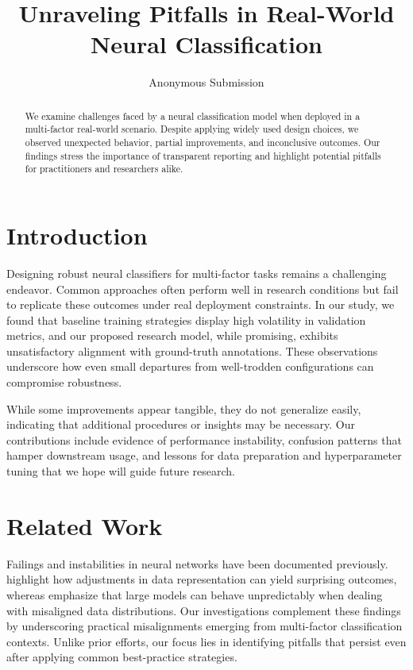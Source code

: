 \documentclass[11pt]{article}
\begin{document}
\title{Unraveling Pitfalls in Real-World Neural Classification}
\author{Anonymous Submission}
\date{}
\maketitle

\begin{abstract}
We examine challenges faced by a neural classification model when deployed in a multi-factor real-world scenario. Despite applying widely used design choices, we observed unexpected behavior, partial improvements, and inconclusive outcomes. Our findings stress the importance of transparent reporting and highlight potential pitfalls for practitioners and researchers alike.
\end{abstract}

\section{Introduction}
Designing robust neural classifiers for multi-factor tasks remains a challenging endeavor. Common approaches often perform well in research conditions but fail to replicate these outcomes under real deployment constraints. In our study, we found that baseline training strategies display high volatility in validation metrics, and our proposed research model, while promising, exhibits unsatisfactory alignment with ground-truth annotations. These observations underscore how even small departures from well-trodden configurations can compromise robustness.

While some improvements appear tangible, they do not generalize easily, indicating that additional procedures or insights may be necessary. Our contributions include evidence of performance instability, confusion patterns that hamper downstream usage, and lessons for data preparation and hyperparameter tuning that we hope will guide future research.

\section{Related Work}
Failings and instabilities in neural networks have been documented previously. \citet{Clark2018} highlight how adjustments in data representation can yield surprising outcomes, whereas \citet{Brown2020} emphasize that large models can behave unpredictably when dealing with misaligned data distributions. Our investigations complement these findings by underscoring practical misalignments emerging from multi-factor classification contexts. Unlike prior efforts, our focus lies in identifying pitfalls that persist even after applying common best-practice strategies.
\end{document}

